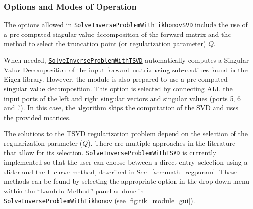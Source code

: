     \subsubsection{Options and Modes of Operation}

    The options allowed in \href{http://scirundocwiki.sci.utah.edu/SCIRunDocs/index.php5/CIBC:Documentation:SCIRun:Reference:BioPSE:SolveInverseProblemWithTikhonovSVD}{{\tt SolveInverseProblemWithTikhonovSVD}} include the use of a pre-computed singular value decomposition of the forward matrix and the method to select the truncation point (or regularization parameter) $Q$.


    When needed, \href{http://scirundocwiki.sci.utah.edu/SCIRunDocs/index.php5/CIBC:Documentation:SCIRun:Reference:BioPSE:SolveInverseProblemWithTSVD}{{\tt SolveInverseProblemWithTSVD}} automatically computes a Singular Value Decomposition of the input forward matrix using sub-routines found in the Eigen library.
    However, the module is also prepared to use a pre-computed singular value decomposition.
    This option is selected by connecting ALL the input ports of the left and right singular vectors and singular values (ports 5, 6 and 7).
    In this case, the algorithm skips the computation of the SVD and uses the provided matrices.


    The solutions to the TSVD regularization problem depend on the selection of the regularization parameter ($Q$).
    There are multiple approaches in the literature that allow for its selection.
    \href{http://scirundocwiki.sci.utah.edu/SCIRunDocs/index.php5/CIBC:Documentation:SCIRun:Reference:BioPSE:SolveInverseProblemWithTSVD}{{\tt SolveInverseProblemWithTSVD}} is currently implemented so that the user can choose between a direct entry, selection using a slider and the L-curve method, described in Sec.~\ref{sec:math_regparam}.
    These methods can be found by selecting the appropriate option in the drop-down menu within the ``Lambda Method'' panel as done in \href{http://scirundocwiki.sci.utah.edu/SCIRunDocs/index.php/CIBC:Documentation:SCIRun:Reference:BioPSE:SolveInverseProblemWithTikhonov}{{\tt SolveInverseProblemWithTikhonov}} (see \autoref{fig:tik_module_gui}).



